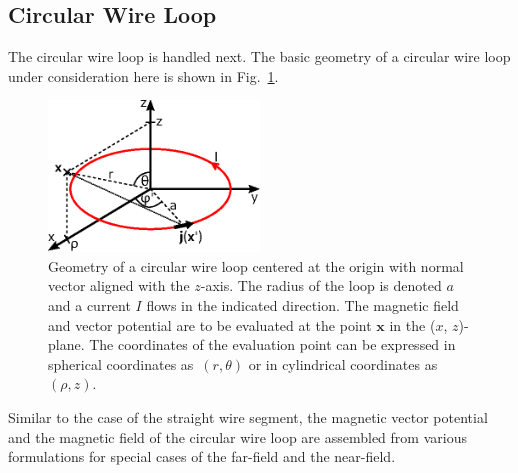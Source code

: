 \subsection{Circular Wire Loop}
The circular wire loop is handled next.
The basic geometry of a circular wire loop under consideration here is shown in Fig.~\ref{fig:circularWireLoop}.
\begin{figure}[htbp]
 \centering
 \includegraphics[width=0.5\textwidth]{img/circularWireLoop.eps}
 \caption{Geometry of a circular wire loop centered at the origin with normal vector aligned with the $z$-axis.
          The radius of the loop is denoted $a$ and a current $I$ flows in the indicated direction.
          The magnetic field and vector potential are to be evaluated at the point $\mathbf{x}$ in the ($x$, $z$)-plane.
          The coordinates of the evaluation point can be expressed in spherical coordinates as~$(r, \theta)$
          or in cylindrical coordinates as~$(\rho, z)$.}
 \label{fig:circularWireLoop}
\end{figure}
Similar to the case of the straight wire segment,
the magnetic vector potential and the magnetic field of the circular wire loop
are assembled from various formulations for special cases of the far-field and the near-field.

